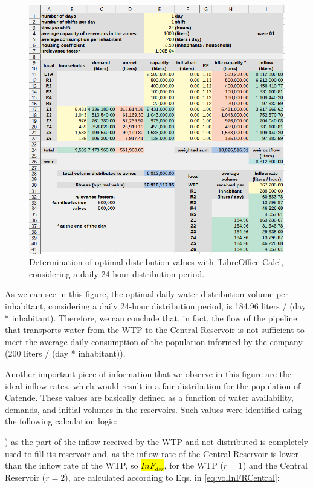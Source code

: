 \documentclass{singlecol}
\theoremstyle{TH}{
\newtheorem{lemma}{Lemma}
\newtheorem{theorem}[lemma]{Theorem}
\newtheorem{corrolary}[lemma]{Corrolary}
\newtheorem{conjecture}[lemma]{Conjecture}
\newtheorem{proposition}[lemma]{Proposition}
\newtheorem{claim}[lemma]{Claim}
\newtheorem{stheorem}[lemma]{Wrong Theorem}
\newtheorem{algorithm}{Algorithm}
}
\theoremstyle{THrm}{
\newtheorem{definition}{Definition}[section]
\newtheorem{question}{Question}[section]
\newtheorem{remark}{Remark}
\newtheorem{scheme}{Scheme}
}
\theoremstyle{THhit}{
\newtheorem{case}{Case}[section]
}
\begin{document}
\begin{figure}[h!]
	\begin{center}
	    \caption{Determination of optimal distribution values with 'LibreOffice Calc', considering a daily 24-hour distribution period.}
		\label{fig:evalOptimalValues}
		\centering
		\includegraphics[width=\textwidth]{figures/evalCase01.png}
	\end{center}
\end{figure}

As we can see in this figure, the optimal daily water distribution volume per inhabitant, considering a daily 24-hour distribution period, is 184.96 liters / (day * inhabitant). Therefore, we can conclude that, in fact, the flow of the pipeline that transports water from the WTP to the Central Reservoir is not sufficient to meet the average daily consumption of the population informed by the company (200 liters / (day * inhabitant)).

Another important piece of information that we observe in this figure are the ideal inflow rates, which would result in a fair distribution for the population of Catende. These values are basically defined as a function of water availability, demands, and initial volumes in the reservoirs. Such values were identified using the following calculation logic:

) as the part of the inflow received by the WTP and not distributed is completely used to fill its reservoir and, as the inflow rate of the Central Reservoir is lower than the inflow rate of the WTP, so \hl{$InF_{dsr}$}, for the WTP ($r=1$) and the Central Reservoir  ($r=2$), are calculated according to Eqs. in \ref{eq:volInFRCentral}: 
\end{document}
